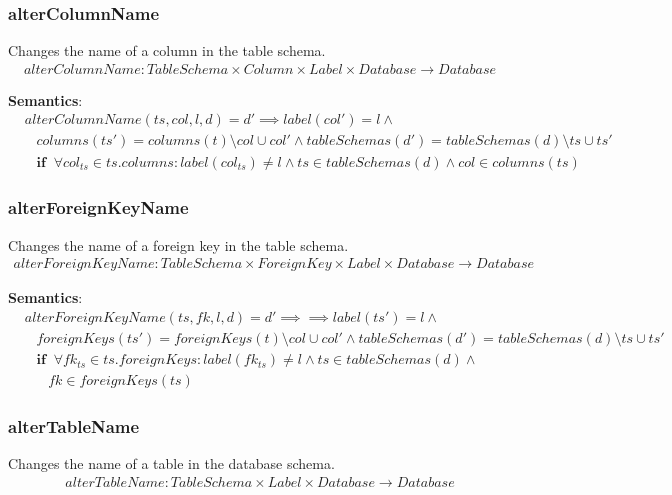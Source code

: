 \documentclass[10pt]{article}
\begin{document}
\subsubsection{alterColumnName}
Changes the name of a column in the table schema.
\begin{align}
alterColumnName: TableSchema \times Column \times Label \times Database \rightarrow Database
\end{align}

\noindent \textbf{Semantics}:
\begin{align}
& alterColumnName(ts, col, l, d) = d' \implies label(col') = l \land \nonumber \\
& \;\;\; columns(ts') = columns(t) \setminus col \cup col' \land tableSchemas(d') = tableSchemas(d) \setminus ts \cup ts'  \nonumber \\
& \;\;\; \mathbf{if}  \;\;  \forall col_{ts} \in ts.columns : label(col_{ts}) \neq l \land ts \in tableSchemas(d) \land col \in columns(ts) 
\end{align}

\subsubsection{alterForeignKeyName}
Changes the name of a foreign key in the table schema.
\begin{align}
alterForeignKeyName: TableSchema \times ForeignKey \times Label \times Database \rightarrow Database
\end{align}

\noindent \textbf{Semantics}:
\begin{align}
& alterForeignKeyName(ts, fk, l, d) = d' \implies \implies label(ts') = l \land \nonumber \\
& \;\;\; foreignKeys(ts') = foreignKeys(t) \setminus col \cup col' \land tableSchemas(d') = tableSchemas(d) \setminus ts \cup ts'  \nonumber \\
& \;\;\; \mathbf{if}  \;\;  \forall fk_{ts} \in ts.foreignKeys : label(fk_{ts}) \neq l \land ts \in tableSchemas(d) \land \nonumber \\
& \;\;\;\;\;\; fk \in foreignKeys(ts) 
\end{align}

\subsubsection{alterTableName}
Changes the name of a table in the database schema.
\begin{align}
alterTableName: TableSchema \times Label \times Database \rightarrow Database
\end{align}
\end{document}
